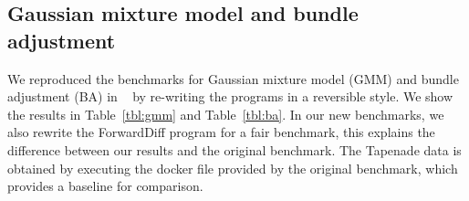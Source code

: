 \documentclass{article}
\newcommand{\<}{\langle}
\renewcommand{\>}{\rangle}
\newcommand{\Tbl}[1]{Table~\ref{#1}}
\newcommand{\ra}[1]{\renewcommand{\arraystretch}{#1}}
\theoremstyle{definition}\newtheorem{definition}{\textit{Definition}}
\begin{document}
\subsection{Gaussian mixture model and bundle adjustment}\label{sec:ba}

We reproduced the benchmarks for Gaussian mixture model (GMM) and bundle adjustment (BA) in ~\cite{Srajer2018} by re-writing the programs in a reversible style. We show the results in \Tbl{tbl:gmm} and \Tbl{tbl:ba}. In our new benchmarks, we also rewrite the ForwardDiff program for a fair benchmark, this explains the difference between our results and the original benchmark. The Tapenade data is obtained by executing the docker file provided by the original benchmark, which provides a baseline for comparison.

\begin{table}[h!]\centering
    \scriptsize
\begin{minipage}{\columnwidth}
\ra{1.3}
    \caption{Absolute runtimes in seconds for computing the objective (O) and gradients (G) of GMM with 10k data points. ``-'' represents missing data due to not finishing the computing in limited time.}\label{tbl:gmm}
\end{minipage}
\end{table}
\end{document}
